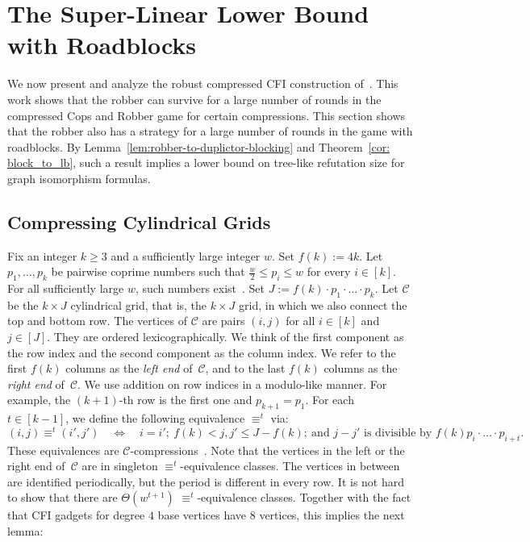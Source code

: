 \documentclass[10pt,a4paper]{article}
\newcommand{\defining}[1]{\emph{#1}}
\newcommand{\comp}{\equiv}
\newcommand{\grid}{\mathcal{C}}
\begin{document}
 
\section{The Super-Linear Lower Bound with Roadblocks}
\label{sec:super-linear-lower-bound}
We now present and analyze the robust compressed CFI construction of~\cite{RFJN024}.
This work shows that the robber can survive for a large number of
rounds in the compressed Cops and Robber game for certain
compressions.
This section shows that the robber also has a strategy for a large number of rounds
in the game with roadblocks. By Lemma~\ref{lem:robber-to-duplictor-blocking} and Theorem~\ref{cor: block_to_lb}, such a result implies a lower bound on tree-like refutation size for graph isomorphism formulas.

\subsection{Compressing Cylindrical Grids}
\label{sec:compressing-cylindrical-grids}

Fix an integer $k\geq 3$ and a sufficiently large integer $w$.
Set $f(k) := 4k$. 
Let $p_1,\dots,p_k$
be pairwise coprime numbers such that
$\frac{w}{2} \leq p_i \leq w$
for every $i \in [k]$. For all sufficiently large $w$, such numbers exist~\cite{DBLP:conf/focs/GroheLNS23}.
Set $J := f(k)\cdot p_1\cdot\ldots \cdot p_k$.
Let $\grid$ be the $k \times J$ cylindrical grid,
that is, the $k\times J$ grid, in which we also connect the
top and bottom row.
The vertices of $\grid$ are pairs $(i,j)$ for all $i\in[k]$ and $j \in [J]$. They are ordered lexicographically.
We think of the first component as the row index and the second component as the column index.
We refer to the first $f(k)$ columns
as the \defining{left end} of~$\grid$, and
to the last $f(k)$ columns as the \defining{right end} of~$\grid$.
We use addition on row indices in a modulo-like manner.
For example, the $(k+1)$-th row is the first one and $p_{k+1} = p_1$.
For each  $t \in [k-1]$, we define the following equivalence $\comp^t$ via:
\[(i,j) \comp^{t} (i',j') \quad \Longleftrightarrow \quad i=i';\ f(k) < j,j' \leq J-f(k);\  \text{and } j-j'
\text { is divisible by } f(k)p_i\cdot\ldots \cdot p_{i+t}.\] 
These equivalences are $\grid$-compressions~\cite{RFJN024}.
Note that the vertices in the left or the right end of~$\grid$
are in singleton $\comp^t$-equivalence classes. The vertices in between are identified periodically, but the period is different in every row.
It is not hard to show that there are $\Theta(w^{t+1})$ $\comp^t$-equivalence classes. Together with the fact that CFI gadgets for degree $4$ base vertices have $8$ vertices, this implies the next lemma:
\end{document}
